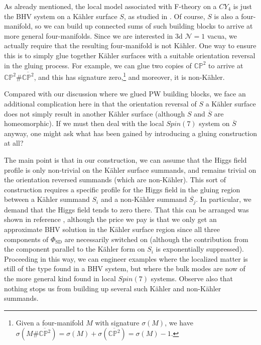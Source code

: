 \documentclass[12pt]{article}%
\numberwithin{equation}{section}
\renewcommand{\(}{\left(}
\renewcommand{\)}{\right)}
\renewcommand{\[}{\left[}
\renewcommand{\]}{\right]}
\begin{document}
As already mentioned, the local model associated with F-theory on a $CY_4$ is just the BHV system on a K\"ahler surface $S$,
as studied in \cite{Donagi:2008ca, Beasley:2008dc, Beasley:2008kw}. Of course, $S$ is also a four-manifold, so we can build up connected sums of such building blocks to arrive at more general four-manifolds. Since we are interested in 3d $\mathcal{N} = 1$ vacua, we actually require that the resulting four-manifold is not K\"ahler. One way to ensure this is to simply glue together K\"ahler surfaces with a suitable orientation reversal in the gluing process. For example, we can glue two copies of $\mathbb{CP}^2$ to arrive at $\mathbb{CP}^2 \# \overline{\mathbb{CP}^2}$, and this has signature zero,\footnote{Given a four-manifold $M$ with signature $\sigma(M)$, we have $\sigma(M \# \overline{\mathbb{CP}^2}) = \sigma(M) + \sigma(\overline{\mathbb{CP}^2}) = \sigma(M) - 1$.} and moreover, it is non-K\"ahler.

Compared with our discussion where we glued PW building blocks, we face an additional complication here in that the orientation reversal of $S$ a K\"ahler surface does not simply result in another K\"ahler surface (although $S$ and $\overline{S}$ are homeomorphic). If we must then deal with the local $Spin(7)$ system on $\overline{S}$ anyway, one might ask what has been gained by introducing a gluing construction at all?

The main point is that in our construction, we can assume that the Higgs field profile is only non-trivial on the K\"ahler surface summands, and remains trivial on the orientation reversed summands (which are non-K\"ahler). This sort of construction requires a specific profile for the Higgs field in the gluing region between a K\"ahler summand $S_i$ and a non-K\"ahler summand $\overline{S_j}$. In particular, we demand that the Higgs field tends to zero there. That this can be arranged was shown in reference \cite{Cvetic:2020piw}, although the price we pay is that we only get an approximate BHV solution in the K\"ahler surface region since all three components of $\Phi_{\mathrm{SD}}$ are necessarily switched on (although the contribution from the component parallel to the K\"ahler form on $S_i$ is exponentially suppressed). Proceeding in this way, we can engineer examples where the localized matter is still of the type found in a BHV system, but where the bulk modes are now of the more general kind found in local $Spin(7)$ systems. Observe also that nothing stops us from building up several such K\"ahler and non-K\"ahler summands.
\end{document}
